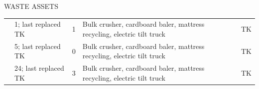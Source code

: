 \textcolor{ccorange}{WASTE ASSETS}

\begin{table}[H]
\small
\begin{tabular}{V{.25\columnwidth}|V{.15\columnwidth}|V{.15\columnwidth}|V{.25\columnwidth}|V{.15\columnwidth}|}
                                                                                              &  &  &    &  \\ \hline
{}        & 1; last replaced TK                                                & 1                                                                  & Bulk crusher, cardboard baler, mattress recycling, electric tilt truck & TK                                                            \\ \hline
{} & 5; last replaced TK                                                & 0                                                                  & Bulk crusher, cardboard baler, mattress recycling, electric tilt truck & TK                                                            \\ \hline
{}            & 24; last replaced TK                                               & 3                                                                  & Bulk crusher, cardboard baler, mattress recycling, electric tilt truck & TK                                                            \\ \hline
\end{tabular}
\end{table}

